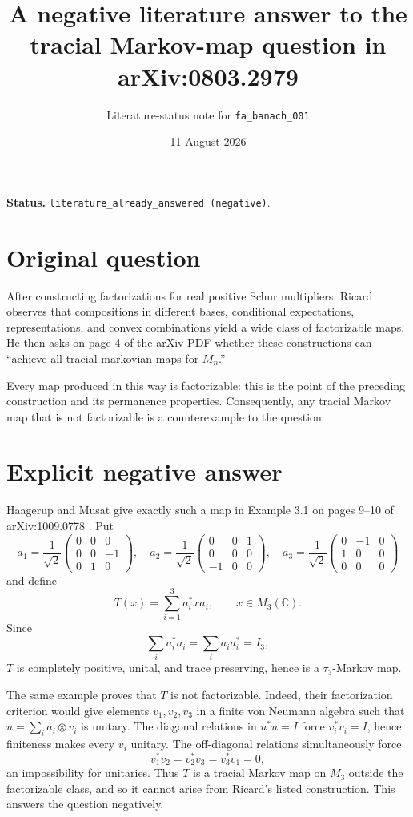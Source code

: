 \documentclass[11pt]{article}
\title{A negative literature answer to the tracial Markov-map question in arXiv:0803.2979}
\author{Literature-status note for \texttt{fa\_banach\_001}}
\date{11 August 2026}
\begin{document}
\maketitle

\noindent\textbf{Status.}
\texttt{literature\_already\_answered (negative)}.

\section*{Original question}

After constructing factorizations for real positive Schur multipliers,
Ricard observes that compositions in different bases, conditional
expectations, representations, and convex combinations yield a wide class
of factorizable maps.  He then asks on page 4 of the arXiv PDF
\cite{Ricard2008} whether these constructions can ``achieve all tracial
markovian maps for $M_n$.''

Every map produced in this way is factorizable: this is the point of the
preceding construction and its permanence properties.  Consequently, any
tracial Markov map that is not factorizable is a counterexample to the
question.

\section*{Explicit negative answer}

Haagerup and Musat give exactly such a map in Example 3.1 on pages 9--10 of
arXiv:1009.0778 \cite{HaagerupMusat2011}.  Put
\[
 a_1=\frac1{\sqrt2}\begin{pmatrix}0&0&0\\0&0&-1\\0&1&0\end{pmatrix},\quad
 a_2=\frac1{\sqrt2}\begin{pmatrix}0&0&1\\0&0&0\\-1&0&0\end{pmatrix},\quad
 a_3=\frac1{\sqrt2}\begin{pmatrix}0&-1&0\\1&0&0\\0&0&0\end{pmatrix}
\]
and define
\[
 T(x)=\sum_{i=1}^3a_i^*xa_i,\qquad x\in M_3(\mathbb C).
\]
Since
\[
 \sum_i a_i^*a_i=\sum_i a_i a_i^*=I_3,
\]
$T$ is completely positive, unital, and trace preserving, hence is a
$\tau_3$-Markov map.

The same example proves that $T$ is not factorizable.  Indeed, their
factorization criterion would give elements $v_1,v_2,v_3$ in a finite von
Neumann algebra such that $u=\sum_i a_i\otimes v_i$ is unitary.  The diagonal
relations in $u^*u=I$ force $v_i^*v_i=I$, hence finiteness makes every $v_i$
unitary.  The off-diagonal relations simultaneously force
\[
 v_1^*v_2=v_2^*v_3=v_3^*v_1=0,
\]
an impossibility for unitaries.  Thus $T$ is a tracial Markov map on $M_3$
outside the factorizable class, and so it cannot arise from Ricard's listed
construction.  This answers the question negatively.
\end{document}

